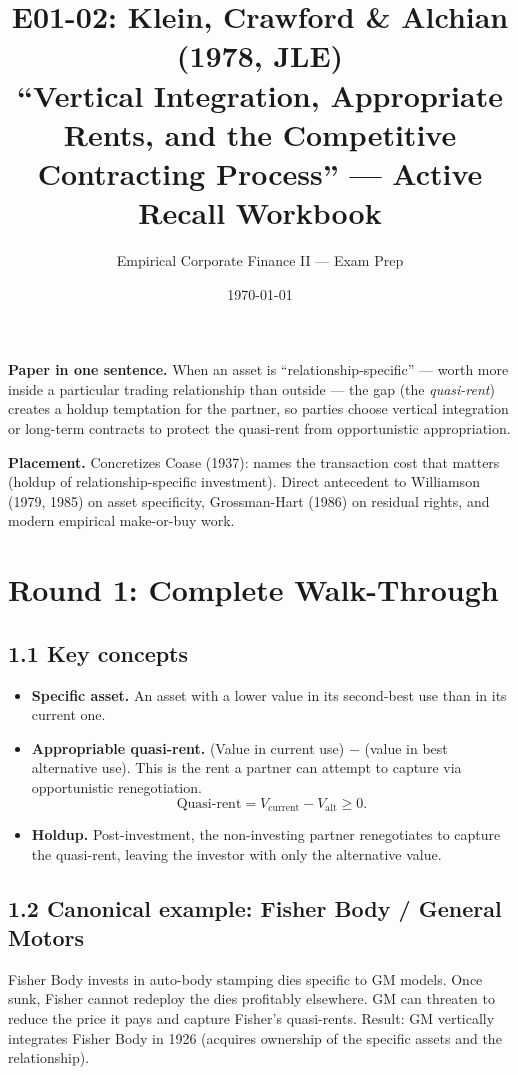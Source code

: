 \documentclass[11pt]{article}
\title{E01-02: Klein, Crawford \& Alchian (1978, JLE) \\
\large ``Vertical Integration, Appropriate Rents, and the Competitive Contracting Process'' --- Active Recall Workbook}
\author{Empirical Corporate Finance II --- Exam Prep}
\date{\today}
\begin{document}
\maketitle

\begin{keybox}
\textbf{Paper in one sentence.} When an asset is ``relationship-specific'' --- worth more inside a particular trading relationship than outside --- the gap (the \emph{quasi-rent}) creates a holdup temptation for the partner, so parties choose vertical integration or long-term contracts to protect the quasi-rent from opportunistic appropriation.

\textbf{Placement.} Concretizes Coase (1937): names the transaction cost that matters (holdup of relationship-specific investment). Direct antecedent to Williamson (1979, 1985) on asset specificity, Grossman-Hart (1986) on residual rights, and modern empirical make-or-buy work.
\end{keybox}

\section*{Round 1: Complete Walk-Through}

\subsection*{1.1 Key concepts}
\begin{itemize}
\item \textbf{Specific asset.} An asset with a lower value in its second-best use than in its current one.
\item \textbf{Appropriable quasi-rent.} (Value in current use) $-$ (value in best alternative use). This is the rent a partner can attempt to capture via opportunistic renegotiation.
\[
\text{Quasi-rent} = V_{\text{current}} - V_{\text{alt}} \ge 0.
\]
\item \textbf{Holdup.} Post-investment, the non-investing partner renegotiates to capture the quasi-rent, leaving the investor with only the alternative value.
\end{itemize}

\subsection*{1.2 Canonical example: Fisher Body / General Motors}
Fisher Body invests in auto-body stamping dies specific to GM models. Once sunk, Fisher cannot redeploy the dies profitably elsewhere. GM can threaten to reduce the price it pays and capture Fisher's quasi-rents. Result: GM vertically integrates Fisher Body in 1926 (acquires ownership of the specific assets and the relationship).
\end{document}
